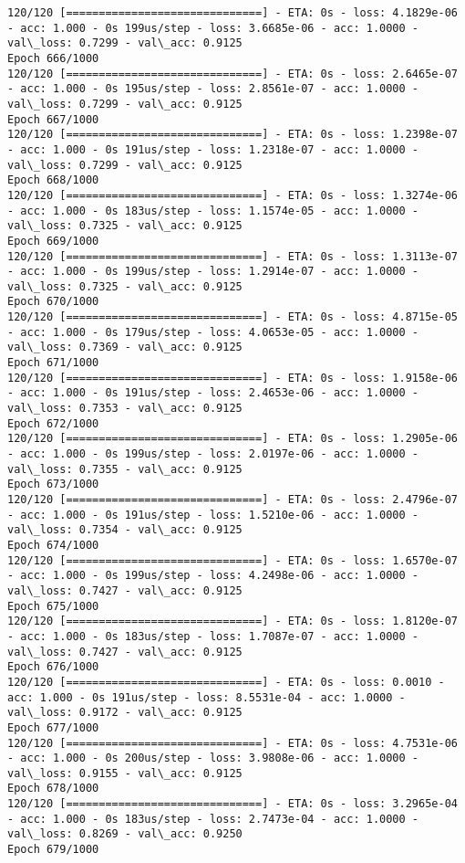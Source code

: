 \documentclass[11pt]{article}
\begin{document}
\begin{Verbatim}[commandchars=\\\{\}]
120/120 [==============================] - ETA: 0s - loss: 4.1829e-06 - acc: 1.000 - 0s 199us/step - loss: 3.6685e-06 - acc: 1.0000 - val\_loss: 0.7299 - val\_acc: 0.9125
Epoch 666/1000
120/120 [==============================] - ETA: 0s - loss: 2.6465e-07 - acc: 1.000 - 0s 195us/step - loss: 2.8561e-07 - acc: 1.0000 - val\_loss: 0.7299 - val\_acc: 0.9125
Epoch 667/1000
120/120 [==============================] - ETA: 0s - loss: 1.2398e-07 - acc: 1.000 - 0s 191us/step - loss: 1.2318e-07 - acc: 1.0000 - val\_loss: 0.7299 - val\_acc: 0.9125
Epoch 668/1000
120/120 [==============================] - ETA: 0s - loss: 1.3274e-06 - acc: 1.000 - 0s 183us/step - loss: 1.1574e-05 - acc: 1.0000 - val\_loss: 0.7325 - val\_acc: 0.9125
Epoch 669/1000
120/120 [==============================] - ETA: 0s - loss: 1.3113e-07 - acc: 1.000 - 0s 199us/step - loss: 1.2914e-07 - acc: 1.0000 - val\_loss: 0.7325 - val\_acc: 0.9125
Epoch 670/1000
120/120 [==============================] - ETA: 0s - loss: 4.8715e-05 - acc: 1.000 - 0s 179us/step - loss: 4.0653e-05 - acc: 1.0000 - val\_loss: 0.7369 - val\_acc: 0.9125
Epoch 671/1000
120/120 [==============================] - ETA: 0s - loss: 1.9158e-06 - acc: 1.000 - 0s 191us/step - loss: 2.4653e-06 - acc: 1.0000 - val\_loss: 0.7353 - val\_acc: 0.9125
Epoch 672/1000
120/120 [==============================] - ETA: 0s - loss: 1.2905e-06 - acc: 1.000 - 0s 199us/step - loss: 2.0197e-06 - acc: 1.0000 - val\_loss: 0.7355 - val\_acc: 0.9125
Epoch 673/1000
120/120 [==============================] - ETA: 0s - loss: 2.4796e-07 - acc: 1.000 - 0s 191us/step - loss: 1.5210e-06 - acc: 1.0000 - val\_loss: 0.7354 - val\_acc: 0.9125
Epoch 674/1000
120/120 [==============================] - ETA: 0s - loss: 1.6570e-07 - acc: 1.000 - 0s 199us/step - loss: 4.2498e-06 - acc: 1.0000 - val\_loss: 0.7427 - val\_acc: 0.9125
Epoch 675/1000
120/120 [==============================] - ETA: 0s - loss: 1.8120e-07 - acc: 1.000 - 0s 183us/step - loss: 1.7087e-07 - acc: 1.0000 - val\_loss: 0.7427 - val\_acc: 0.9125
Epoch 676/1000
120/120 [==============================] - ETA: 0s - loss: 0.0010 - acc: 1.000 - 0s 191us/step - loss: 8.5531e-04 - acc: 1.0000 - val\_loss: 0.9172 - val\_acc: 0.9125
Epoch 677/1000
120/120 [==============================] - ETA: 0s - loss: 4.7531e-06 - acc: 1.000 - 0s 200us/step - loss: 3.9808e-06 - acc: 1.0000 - val\_loss: 0.9155 - val\_acc: 0.9125
Epoch 678/1000
120/120 [==============================] - ETA: 0s - loss: 3.2965e-04 - acc: 1.000 - 0s 183us/step - loss: 2.7473e-04 - acc: 1.0000 - val\_loss: 0.8269 - val\_acc: 0.9250
Epoch 679/1000

\end{Verbatim}
\end{document}
